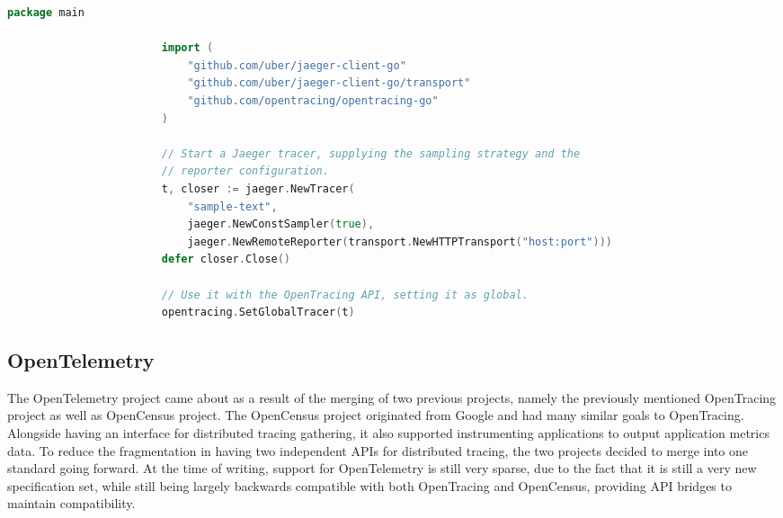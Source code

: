 \documentclass[12pt,pdftex,titlepage]{report}
\begin{document}
                \begin{spacing}{1.0}
                    \begin{lstlisting}[caption=Example Go language snippet of instatiating a Jaeger OpenTracing compatible tracer., language=Go, gobble=24, label={lst:jaegertrace}]
                        package main

                        import (
                            "github.com/uber/jaeger-client-go"
                            "github.com/uber/jaeger-client-go/transport"
                            "github.com/opentracing/opentracing-go"
                        )

                        // Start a Jaeger tracer, supplying the sampling strategy and the
                        // reporter configuration.
                        t, closer := jaeger.NewTracer(
                            "sample-text",
                            jaeger.NewConstSampler(true),
                            jaeger.NewRemoteReporter(transport.NewHTTPTransport("host:port")))
                        defer closer.Close()

                        // Use it with the OpenTracing API, setting it as global.
                        opentracing.SetGlobalTracer(t)
                    \end{lstlisting}
                \end{spacing}

            \subsection{OpenTelemetry}
            \label{sec:opentele}
                The OpenTelemetry\cite{opentelemetry} project came about as a result of the merging of two previous projects, namely the previously mentioned OpenTracing
                project as well as OpenCensus project. The OpenCensus project originated from Google and had many similar goals to OpenTracing. Alongside having an interface
                for distributed tracing gathering, it also supported instrumenting applications to output application metrics data. To reduce the fragmentation in having
                two independent APIs for distributed tracing, the two projects decided to merge into one standard going forward. At the time of writing, support for OpenTelemetry
                is still very sparse, due to the fact that it is still a very new specification set, while still being largely backwards compatible with both OpenTracing and 
                OpenCensus, providing API bridges to maintain compatibility. 
\end{document}
